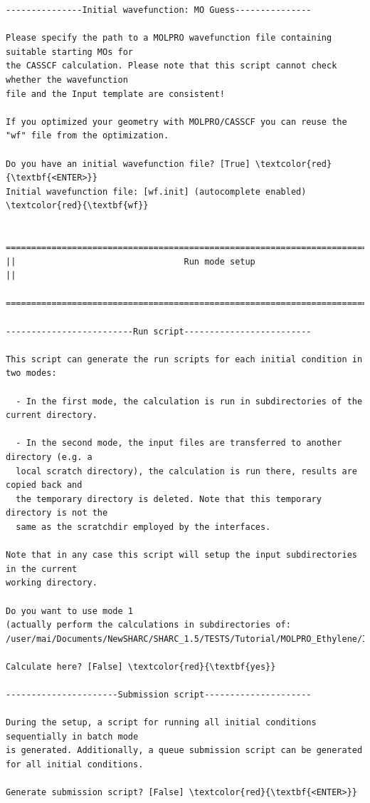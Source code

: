 \documentclass[a4paper,11pt,DIV=15,openany]{scrbook}
\begin{document}
\begin{oframed}
\begin{Verbatim}[commandchars=\\\{\}]
---------------Initial wavefunction: MO Guess---------------

Please specify the path to a MOLPRO wavefunction file containing suitable starting MOs for 
the CASSCF calculation. Please note that this script cannot check whether the wavefunction 
file and the Input template are consistent!

If you optimized your geometry with MOLPRO/CASSCF you can reuse the "wf" file from the optimization.

Do you have an initial wavefunction file? [True] \textcolor{red}{\textbf{<ENTER>}}
Initial wavefunction file: [wf.init] (autocomplete enabled) \textcolor{red}{\textbf{wf}}

  ================================================================================
||                                 Run mode setup                                 ||
  ================================================================================

-------------------------Run script-------------------------

This script can generate the run scripts for each initial condition in two modes:

  - In the first mode, the calculation is run in subdirectories of the current directory.

  - In the second mode, the input files are transferred to another directory (e.g. a 
  local scratch directory), the calculation is run there, results are copied back and 
  the temporary directory is deleted. Note that this temporary directory is not the 
  same as the scratchdir employed by the interfaces.

Note that in any case this script will setup the input subdirectories in the current 
working directory. 

Do you want to use mode 1 
(actually perform the calculations in subdirectories of: 
/user/mai/Documents/NewSHARC/SHARC_1.5/TESTS/Tutorial/MOLPRO_Ethylene/Init)

Calculate here? [False] \textcolor{red}{\textbf{yes}}

----------------------Submission script---------------------

During the setup, a script for running all initial conditions sequentially in batch mode 
is generated. Additionally, a queue submission script can be generated for all initial conditions.

Generate submission script? [False] \textcolor{red}{\textbf{<ENTER>}}



\end{Verbatim}
\end{oframed}
\end{document}
